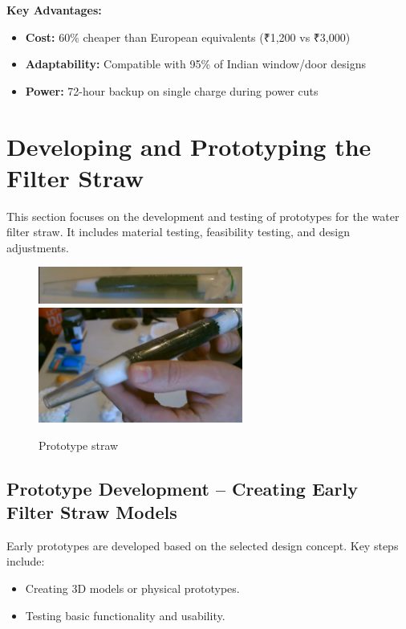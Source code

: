 \documentclass{article}
\begin{document}
\textbf{Key Advantages:}
\begin{itemize}
\item \textbf{Cost:} 60\% cheaper than European equivalents (₹1,200 vs ₹3,000)
\item \textbf{Adaptability:} Compatible with 95\% of Indian window/door designs
\item \textbf{Power:} 72-hour backup on single charge during power cuts
\end{itemize}

\newpage






\section{Developing and Prototyping the Filter Straw}
This section focuses on the development and testing of prototypes for the water filter straw. It includes material testing, feasibility testing, and design adjustments.

\vspace{0.5cm}

\begin{figure}[h!]
    \centering
    \includegraphics[width=0.6\textwidth]{straw.jpeg}
    \includegraphics[width=0.6\textwidth]{straw2.jpg}
    \caption{Prototype straw}
    \label{fig:Filter_prototype}
\end{figure}

\vspace{0.5cm}

\subsection{Prototype Development – Creating Early Filter Straw Models}
Early prototypes are developed based on the selected design concept. Key steps include:
\begin{itemize}
    \item Creating 3D models or physical prototypes.
    \item Testing basic functionality and usability.
\end{itemize}
\end{document}
